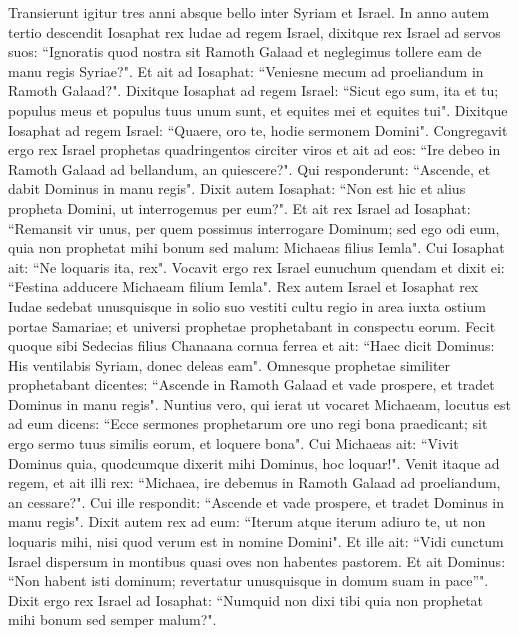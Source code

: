 \begin{biblechapter}  
\verse Transierunt igitur tres anni absque bello inter Syriam et Israel. 
\verse In anno autem tertio descendit Iosaphat rex ludae ad regem Israel, 
\verse dixitque rex Israel ad servos suos: “Ignoratis quod nostra sit Ramoth Galaad et neglegimus tollere eam de manu regis Syriae?". 
\verse Et ait ad Iosaphat: “Veniesne mecum ad proeliandum in Ramoth Galaad?". 
\verse Dixitque Iosaphat ad regem Israel: “Sicut ego sum, ita et tu; populus meus et populus tuus unum sunt, et equites mei et equites tui". Dixitque Iosaphat ad regem Israel: “Quaere, oro te, hodie sermonem Domini". 
\verse Congregavit ergo rex Israel prophetas quadringentos circiter viros et ait ad eos: “Ire debeo in Ramoth Galaad ad bellandum, an quiescere?". Qui responderunt: “Ascende, et dabit Dominus in manu regis". 
\verse Dixit autem Iosaphat: “Non est hic et alius propheta Domini, ut interrogemus per eum?". 
\verse Et ait rex Israel ad Iosaphat: “Remansit vir unus, per quem possimus interrogare Dominum; sed ego odi eum, quia non prophetat mihi bonum sed malum: Michaeas filius Iemla". Cui Iosaphat ait: “Ne loquaris ita, rex". 
\verse Vocavit ergo rex Israel eunuchum quendam et dixit ei: “Festina adducere Michaeam filium Iemla". 
\verse Rex autem Israel et Iosaphat rex Iudae sedebat unusquisque in solio suo vestiti cultu regio in area iuxta ostium portae Samariae; et universi prophetae prophetabant in conspectu eorum. 
\verse Fecit quoque sibi Sedecias filius Chanaana cornua ferrea et ait: “Haec dicit Dominus: His ventilabis Syriam, donec deleas eam". 
\verse Omnesque prophetae similiter prophetabant dicentes: “Ascende in Ramoth Galaad et vade prospere, et tradet Dominus in manu regis". 
\verse Nuntius vero, qui ierat ut vocaret Michaeam, locutus est ad eum dicens: “Ecce sermones prophetarum ore uno regi bona praedicant; sit ergo sermo tuus similis eorum, et loquere bona". 
\verse Cui Michaeas ait: “Vivit Dominus quia, quodcumque dixerit mihi Dominus, hoc loquar!". 
\verse Venit itaque ad regem, et ait illi rex: “Michaea, ire debemus in Ramoth Galaad ad proeliandum, an cessare?". Cui ille respondit: “Ascende et vade prospere, et tradet Dominus in manu regis". 
\verse Dixit autem rex ad eum: “Iterum atque iterum adiuro te, ut non loquaris mihi, nisi quod verum est in nomine Domini". 
\verse Et ille ait: “Vidi cunctum Israel dispersum in montibus quasi oves non habentes pastorem. Et ait Dominus: “Non habent isti dominum; revertatur unusquisque in domum suam in pace”". 
\verse Dixit ergo rex Israel ad Iosaphat: “Numquid non dixi tibi quia non prophetat mihi bonum sed semper malum?". 

\end{biblechapter}
